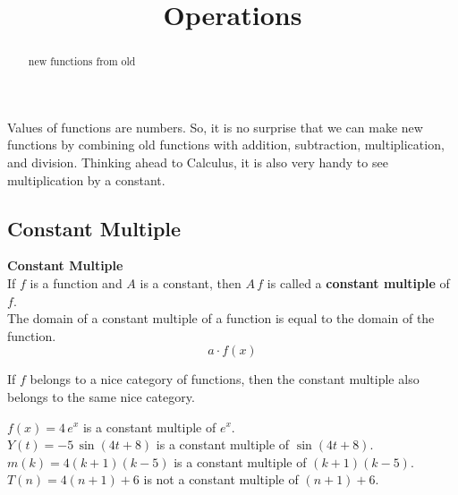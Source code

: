 \documentclass{ximera}
\title{Operations}
\begin{document}
\begin{abstract}
new functions from old
\end{abstract}
\maketitle



Values of functions are numbers.  So, it is no surprise that we can make new functions by combining old functions with addition, subtraction, multiplication, and division. Thinking ahead to Calculus, it is also very handy to see multiplication by a constant.\\








\subsection*{Constant Multiple}


\begin{template}  \textbf{\textcolor{blue!55!black}{Constant Multiple}} \\


If  $f$ is a function and $A$ is a constant, then $A \, f$ is called a \textbf{\textcolor{green!50!black}{constant multiple}} of $f$. \\

The domain of a constant multiple of a function is equal to the domain of the function. \\


\[ a \cdot f(x)  \]



\end{template}



\begin{warning}

If $f$ belongs to a nice category of functions, then the constant multiple also belongs to the same nice category.

\end{warning}




\begin{example}

$f(x) = 4 \, e^x$ is a constant multiple of $e^x$. \\
$Y(t) = -5 \, \sin(4t + 8)$ is a constant multiple of $\sin(4t + 8)$. \\
$m(k) = 4 (k+1)(k-5)$ is a constant multiple of $(k+1)(k-5)$. \\


$T(n) = 4 (n+1) + 6$ is not a constant multiple of $(n+1) + 6$. \\

\end{example}
\end{document}

